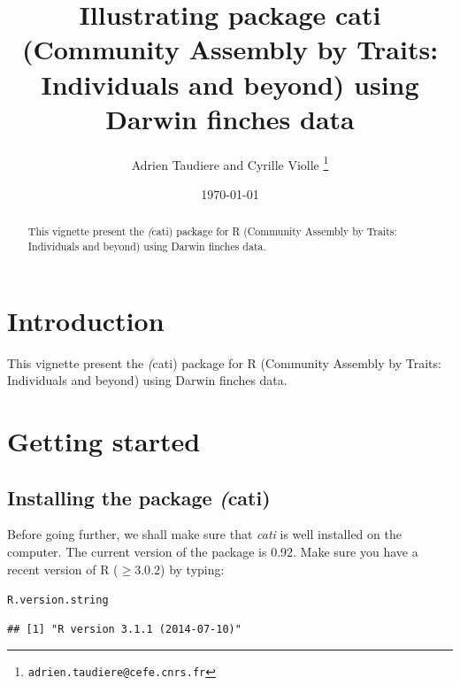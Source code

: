 \documentclass[12pt]{article}\usepackage[]{graphicx}\usepackage[]{color}
\title{Illustrating package cati (Community Assembly by Traits: Individuals and beyond) using Darwin finches data}
\author{Adrien Taudiere and Cyrille Violle
\thanks{\texttt{adrien.taudiere@cefe.cnrs.fr}}
}
\affil{{\footnotesize CEFE - Centre d'Ecologie Fonctionnelle et Evolutive, Montpellier: France}}
\date{\today}
\makeatletter
\newcommand{\hlstd}[1]{\textcolor[rgb]{0.345,0.345,0.345}{#1}}%
\newenvironment{kframe}{%
 \def\at@end@of@kframe{}%
 \ifinner\ifhmode%
  \def\at@end@of@kframe{\end{minipage}}%
  \begin{minipage}{\columnwidth}%
 \fi\fi%
 \def\FrameCommand##1{\hskip\@totalleftmargin \hskip-\fboxsep
 \colorbox{shadecolor}{##1}\hskip-\fboxsep
     \hskip-\linewidth \hskip-\@totalleftmargin \hskip\columnwidth}%
 \MakeFramed {\advance\hsize-\width
   \@totalleftmargin\z@ \linewidth\hsize
   \@setminipage}}%
 {\par\unskip\endMakeFramed%
 \at@end@of@kframe}
\newenvironment{knitrout}{}{} %
\makeatother
\begin{document}



\maketitle

\begin{abstract}
  This vignette present the \textit(cati) package for R (Community Assembly by Traits: Individuals and beyond) using Darwin finches data.
\end{abstract}

\newpage
\tableofcontents

\newpage


\section{Introduction}
This vignette present the \textit(cati) package for R (Community Assembly by Traits: Individuals and beyond) using Darwin finches data.

\section{Getting started}
\subsection{Installing the package \textit(cati)}

Before going further, we shall make sure that \textit{cati} is well installed
on the computer.
The current version of the package is 0.92.
Make sure you have a recent version of R ($\geq 3.0.2$) by typing:

\begin{knitrout}
\color{fgcolor}\begin{kframe}
\begin{alltt}
\hlstd{R.version.string}
\end{alltt}
\begin{verbatim}
## [1] "R version 3.1.1 (2014-07-10)"
\end{verbatim}
\end{kframe}
\end{knitrout}
\end{document}
